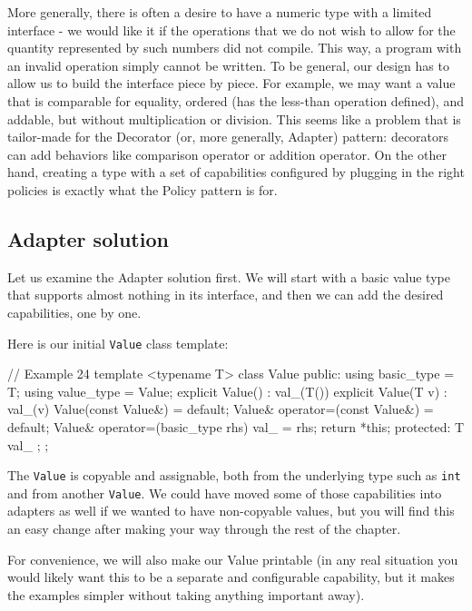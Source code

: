 More generally, there is often a desire to have a numeric type with a limited interface - we would like it if the operations that we do not wish to allow for the quantity represented by such numbers did not compile. This way, a program with an invalid operation simply cannot be written. To be general, our design has to allow us to build the interface piece by piece. For example, we may want a value that is comparable for equality, ordered (has the less-than operation defined), and addable, but without multiplication or division. This seems like a problem that is tailor-made for the Decorator (or, more generally, Adapter) pattern: decorators can add behaviors like comparison operator or addition operator. On the other hand, creating a type with a set of capabilities configured by plugging in the right policies is exactly what the Policy pattern is for.

\subsection{Adapter solution}

Let us examine the Adapter solution first. We will start with a basic value type that supports almost nothing in its interface, and then we can add the desired capabilities, one by one.

Here is our initial \texttt{Value} class template:

\begin{code}
// Example 24
template <typename T> class Value {
  public:
  using basic_type = T;
  using value_type = Value;
  explicit Value() : val_(T()) {}
  explicit Value(T v) : val_(v) {}
  Value(const Value&) = default;
  Value& operator=(const Value&) = default;
  Value& operator=(basic_type rhs) {
    val_ = rhs;
    return *this;
  }
  protected:
  T val_ {};
};
\end{code}

The \texttt{Value} is copyable and assignable, both from the underlying type such as \texttt{int} and from another \texttt{Value}. We could have moved some of those capabilities into adapters as well if we wanted to have non-copyable values, but you will find this an easy change after making your way through the rest of the chapter.

For convenience, we will also make our Value printable (in any real situation you would likely want this to be a separate and configurable capability, but it makes the examples simpler without taking anything important away).

